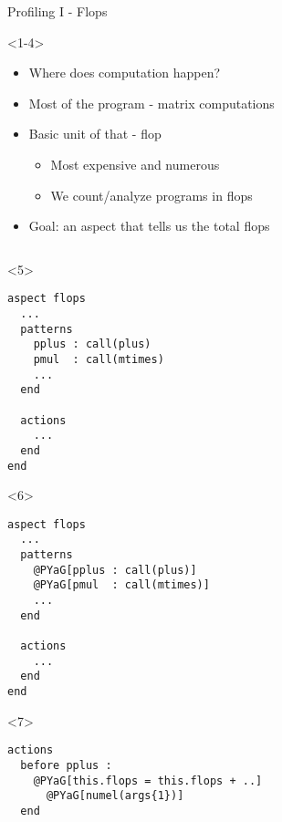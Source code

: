 \begin{frame}[fragile]{Profiling I - Flops}
  \begin{onlyenv}<1-4>
    \vspace{4ex}
    \begin{itemize}
    \item Where does computation happen?
    \pause \item Most of the program - matrix computations
    \pause \item Basic unit of that - flop
      \begin{itemize}
      \item Most expensive and numerous
      \item We count/analyze programs in flops
      \end{itemize}
    \pause \item Goal: an aspect that tells us the total flops
    \end{itemize}
  \end{onlyenv}
    \begin{columns}
      \begin{column}[T]{5cm}
        \begin{onlyenv}<5>
          \begin{Verbatim}[commandchars=@\[\]]
aspect flops
  ...
  patterns
    pplus : call(plus)
    pmul  : call(mtimes)
    ...
  end

  actions
    ...
  end
end
        \end{Verbatim}
      \end{onlyenv}
        \begin{onlyenv}<6>
          \begin{Verbatim}[commandchars=@\[\]]
aspect flops
  ...
  patterns
    @PYaG[pplus : call(plus)]
    @PYaG[pmul  : call(mtimes)]
    ...
  end

  actions
    ...
  end
end
        \end{Verbatim}
      \end{onlyenv}
        \begin{onlyenv}<7>
          \begin{Verbatim}[commandchars=@\[\]]
actions
  before pplus : 
    @PYaG[this.flops = this.flops + ..]
      @PYaG[numel(args{1})]
  end
        

\end{Verbatim}
\end{onlyenv}
\end{column}
\end{columns}
\end{frame}
